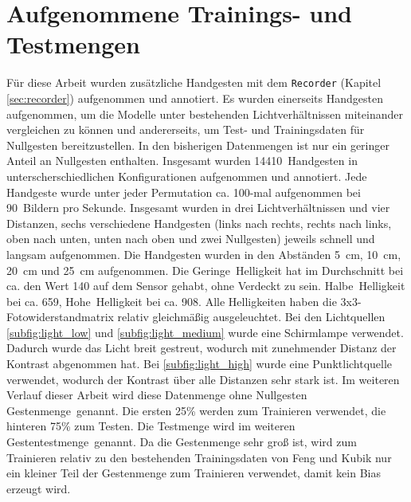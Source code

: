 \section{Aufgenommene Trainings- und Testmengen}
\label{sec:DymelData}
Für diese Arbeit wurden zusätzliche Handgesten mit dem \texttt{Recorder} (Kapitel \ref{sec:recorder}) aufgenommen und annotiert. Es wurden einerseits Handgesten aufgenommen, um die Modelle unter
bestehenden Lichtverhältnissen miteinander vergleichen zu können und andererseits, um Test- und Trainingsdaten für Nullgesten bereitzustellen. In den
bisherigen Datenmengen ist nur ein geringer Anteil an Nullgesten enthalten. Insgesamt wurden 14410~Handgesten in unterscherschiedlichen Konfigurationen aufgenommen und annotiert.
\newline
\newline
Jede Handgeste wurde unter jeder Permutation ca. 100-mal aufgenommen bei 90~Bildern pro Sekunde. Insgesamt wurden in drei Lichtverhältnissen und vier Distanzen, sechs verschiedene Handgesten (links nach rechts,
rechts nach links, oben nach unten, unten nach oben und zwei Nullgesten) jeweils schnell und langsam aufgenommen. Die Handgesten wurden in den Abständen 5~cm, 10~cm, 20~cm und 25~cm aufgenommen.
\newline
\newline
Die \glqq Geringe\grqq\ Helligkeit hat im Durchschnitt bei ca. den Wert 140 auf dem Sensor gehabt, ohne Verdeckt zu sein. \glqq Halbe\grqq\ Helligkeit bei ca. 659, \glqq Hohe\grqq\ Helligkeit bei
ca. 908. Alle Helligkeiten haben die 3x3-Fotowiderstandmatrix
relativ gleichmäßig ausgeleuchtet. Bei den Lichtquellen \ref{subfig:light_low} und \ref{subfig:light_medium} wurde eine Schirmlampe verwendet. Dadurch wurde das Licht breit gestreut,
wodurch mit zunehmender Distanz der Kontrast abgenommen hat. Bei \ref{subfig:light_high} wurde eine Punktlichtquelle verwendet, wodurch der Kontrast über alle Distanzen sehr stark ist.
Im weiteren Verlauf dieser Arbeit wird diese Datenmenge ohne Nullgesten \glqq Gestenmenge\grqq\ genannt. Die ersten 25\% werden zum Trainieren verwendet, die hinteren 75\% zum Testen. Die Testmenge
wird im weiteren \glqq Gestentestmenge\grqq\ genannt. Da die Gestenmenge sehr groß ist, wird zum Trainieren relativ zu den bestehenden Trainingsdaten von Feng und Kubik nur ein kleiner Teil der
Gestenmenge zum Trainieren verwendet, damit kein Bias erzeugt wird.
\newline
\newline
